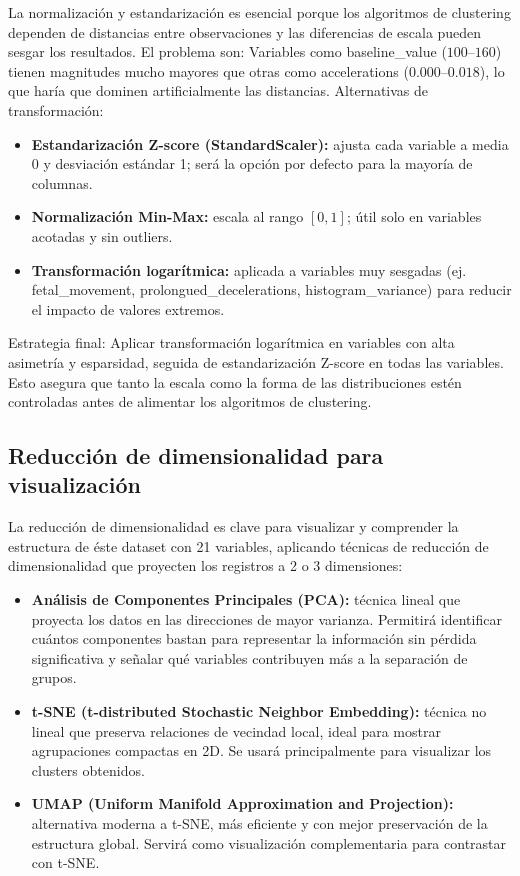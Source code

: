 \documentclass[12pt,letterpaper]{article}
\begin{document}
La normalización y estandarización es esencial porque los algoritmos de clustering dependen de distancias entre observaciones y las diferencias de escala pueden sesgar los resultados. El problema son: Variables como baseline\_value ($100–160$) tienen magnitudes mucho mayores que otras como accelerations ($0.000–0.018$), lo que haría que dominen artificialmente las distancias. Alternativas de transformación:

\begin{itemize}[leftmargin=2em, itemsep=6pt]
  \item \textbf{Estandarización Z-score (StandardScaler):} 
  ajusta cada variable a media 0 y desviación estándar 1; será la opción por defecto para la mayoría de columnas.

  \item \textbf{Normalización Min-Max:} escala al rango $[0,1]$; útil solo en variables acotadas y sin outliers.

  \item \textbf{Transformación logarítmica:} aplicada a variables muy sesgadas (ej. fetal_movement, prolongued_decelerations, histogram\_variance) para reducir el impacto de valores extremos.
\end{itemize}

Estrategia final: Aplicar transformación logarítmica en variables con alta asimetría y esparsidad, seguida de estandarización Z-score en todas las variables. Esto asegura que tanto la escala como la forma de las distribuciones estén controladas antes de alimentar los algoritmos de clustering.

\subsection{Reducción de dimensionalidad para visualización}

La reducción de dimensionalidad es clave para visualizar y comprender la estructura de éste dataset con 21 variables, aplicando técnicas de reducción de dimensionalidad que proyecten los registros a 2 o 3 dimensiones:

\begin{itemize}[leftmargin=2em, itemsep=6pt]
  \item \textbf{Análisis de Componentes Principales (PCA):} técnica lineal que proyecta los datos en las direcciones de mayor varianza. Permitirá identificar cuántos componentes bastan para representar la información sin pérdida significativa y señalar qué variables contribuyen más a la separación de grupos.

  \item \textbf{t-SNE (t-distributed Stochastic Neighbor Embedding):} técnica no lineal que preserva relaciones de vecindad local, ideal para mostrar agrupaciones compactas en 2D. Se usará principalmente para visualizar los clusters obtenidos.

  \item \textbf{UMAP (Uniform Manifold Approximation and Projection):} alternativa moderna a t-SNE, más eficiente y con mejor preservación de la estructura global. Servirá como visualización complementaria para contrastar con t-SNE.
\end{itemize}
\end{document}

